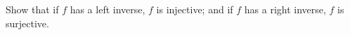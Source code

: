 \documentclass[main.tex]{subfiles}
\begin{document}
\subproblem{}\label{s2p5a}

Show that if \(f\) has a left inverse, \(f\) is injective; and if \(f\) has a
right inverse, \(f\) is surjective.

\todo{}
\end{document}
